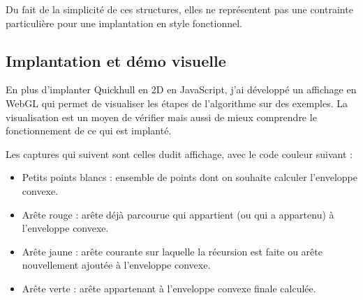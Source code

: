 \documentclass[]{article}
\begin{document}
Du fait de la simplicité de ces structures, elles ne représentent pas une contrainte particulière pour une implantation en style fonctionnel.

\subsection{Implantation et démo visuelle}
En plus d'implanter Quickhull en 2D en JavaScript, j'ai développé un affichage en WebGL qui permet de visualiser les étapes de l'algorithme sur des exemples. La visualisation est un moyen de vérifier mais aussi de mieux comprendre le fonctionnement de ce qui est implanté.

Les captures qui suivent sont celles dudit affichage, avec le code couleur suivant :
\begin{itemize}
	\item Petits points blancs : ensemble de points dont on souhaite calculer l'enveloppe convexe.
	\item Arête rouge : arête déjà parcourue qui appartient (ou qui a appartenu) à l'enveloppe convexe.
	\item Arête jaune : arête courante sur laquelle la récursion est faite ou arête nouvellement ajoutée à l'enveloppe convexe.
	\item Arête verte : arête appartenant à l'enveloppe convexe finale calculée.
\end{itemize}
\end{document}
